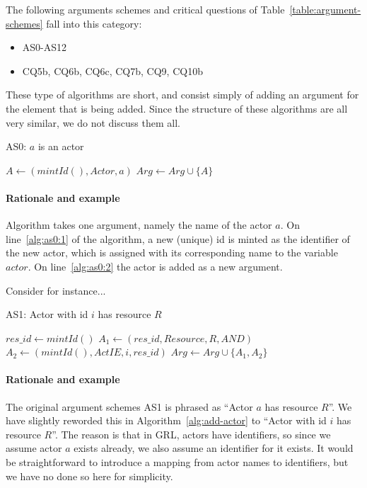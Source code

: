The following arguments schemes and critical questions of Table~\ref{table:argument-schemes} fall into this category:
\begin{itemize}
\item AS0-AS12
\item CQ5b, CQ6b, CQ6c, CQ7b, CQ9, CQ10b
\end{itemize}

These type of algorithms are short, and consist simply of adding an argument for the element that is being added. Since the structure of these algorithms are all very similar, we do not discuss them all. 

\begin{algorithm}[h]
  \caption{AS0: $a$ is an actor}\label{alg:add-actor}
  \begin{algorithmic}[1]
    \State $A \leftarrow (mintId(), Actor, a)$ \label{alg:as0:1}
    \State $Arg\leftarrow Arg \cup \{A\}$\label{alg:as0:2}
    \EndProcedure
  \end{algorithmic}
\end{algorithm}

\paragraph{Rationale and example} Algorithm takes one argument, namely the name of the actor $a$. On line~\ref{alg:as0:1} of the algorithm, a new (unique) id is minted as the identifier of the new actor, which is assigned with its corresponding name to the variable $actor$. On line~\ref{alg:as0:2} the actor is added as a new argument.

Consider for instance...

\begin{algorithm}[h]
  \caption{AS1: Actor with id $i$ has resource $R$}\label{alg:add-actor}
  \begin{algorithmic}[1]
    \State $res\_id\gets mintId()$\label{alg:add-actor:id}
    \State $A_1\leftarrow (res\_id, Resource, R, AND)$\label{alg:add-actor:arg1}
    \State $A_2\leftarrow (mintId(),ActIE, i, res\_id)$\label{alg:add-actor:arg2}
    \State $Arg\gets Arg\cup \{A_1,A_2\}$\label{alg:add-actor:add-arg}
    \EndProcedure
  \end{algorithmic}
\end{algorithm}

\paragraph{Rationale and example} The original argument schemes AS1 is phrased as ``Actor $a$ has resource $R$''. We have slightly reworded this in Algorithm~\ref{alg:add-actor} to ``Actor with id $i$ has resource $R$''. The reason is that in GRL, actors have identifiers, so since we assume actor $a$ exists already, we also assume an identifier for it exists. It would be straightforward to introduce a mapping from actor names to identifiers, but we have no done so here for simplicity. 

